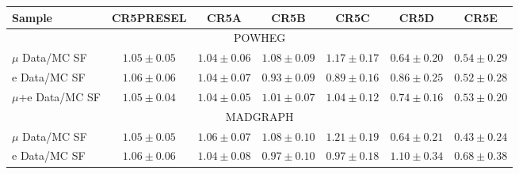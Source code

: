 
\begin{table}[!h]
\begin{center}
{\footnotesize
\begin{tabular}{l||c||c|c|c|c|c}
\hline
Sample              & CR5PRESEL & CR5A & CR5B & CR5C & CR5D & CR5E\\
\hline
\hline
\multicolumn{7}{c}{POWHEG} \\
\hline
$\mu$ Data/MC SF 	  & $1.05 \pm 0.05$ & $1.04 \pm 0.06$ & $1.08 \pm 0.09$ & $1.17 \pm 0.17$ & $0.64 \pm 0.20$ & $0.54 \pm 0.29$ \\
\hline
e Data/MC SF 	  & $1.06 \pm 0.06$ & $1.04 \pm 0.07$ & $0.93 \pm 0.09$ & $0.89 \pm 0.16$ & $0.86 \pm 0.25$ & $0.52 \pm 0.28$ \\
\hline
$\mu$+e Data/MC SF 		  & $1.05 \pm 0.04$ & $1.04 \pm 0.05$ & $1.01 \pm 0.07$ & $1.04 \pm 0.12$ & $0.74 \pm 0.16$ & $0.53 \pm 0.20$ \\
\hline
\hline
\multicolumn{7}{c}{MADGRAPH} \\
\hline
$\mu$ Data/MC SF 	  & $1.05 \pm 0.05$ & $1.06 \pm 0.07$ & $1.08 \pm 0.10$ & $1.21 \pm 0.19$ & $0.64 \pm 0.21$ & $0.43 \pm 0.24$ \\
\hline
e Data/MC SF 	  & $1.06 \pm 0.06$ & $1.04 \pm 0.08$ & $0.97 \pm 0.10$ & $0.97 \pm 0.18$ & $1.10 \pm 0.34$ & $0.68 \pm 0.38$ \\

\end{tabular}}
\end{center}
\end{table}
